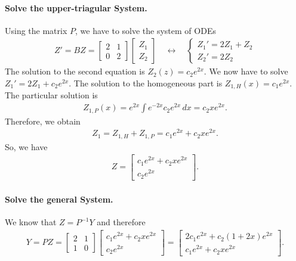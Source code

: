 \documentclass[12pt]{article}
\begin{document}
	\paragraph*{Solve the upper-triagular System.}
	\phantom{2}
	
	\noindent Using the matrix $P$, we have to solve the system of ODEs
		\begin{align*}
		Z' = BZ = \begin{bmatrix}
		2 & 1 \\ 0 & 2
		\end{bmatrix} \begin{bmatrix} Z_1 \\ Z_2 \end{bmatrix} \quad \longleftrightarrow \quad 
		\left\{ \begin{matrix}
		Z_1' = 2Z_1 + Z_2 \\
		Z_2' = 2Z_2
		\end{matrix} \right.
		\end{align*}
	The solution to the second equation is $Z_2 (z) = c_2 e^{2x}$. We now have to solve $Z_1' = 2Z_1 + c_2 e^{2x}$. The solution to the homogeneous part is $Z_{1, H} (x) = c_1 e^{2x}$. The particular solution is
		\begin{align*}
		Z_{1, P} (x) = e^{2x} \int e^{-2x} c_2 e^{2x} \, dx = c_2 x e^{2x} .
		\end{align*}
	Therefore, we obtain
		\begin{align*}
		Z_1 = Z_{1, H} + Z_{1, P} = c_1 e^{2x} + c_2 x e^{2x} .
		\end{align*}
	So, we have
		\begin{align*}
		Z = \begin{bmatrix}
		c_1 e^{2x} + c_2 xe^{2x} \\
		c_2 e^{2x}
		\end{bmatrix} .
		\end{align*}
		
	\paragraph*{Solve the general System.}
	\phantom{2}
	
	\noindent We know that $Z = P^{-1} Y$ and therefore
		\begin{align*}
		Y = PZ = \begin{bmatrix}
		2 & 1 \\ 1 & 0
		\end{bmatrix} \begin{bmatrix}
		c_1 e^{2x} + c_2 xe^{2x} \\
		c_2 e^{2x}
		\end{bmatrix} = \begin{bmatrix}
		2c_1 e^{2x} + c_2 (1 + 2x) e^{2x} \\
		c_1 e^{2x} + c_2 x e^{2x}
		\end{bmatrix} .
		\end{align*}
		
\end{document}
